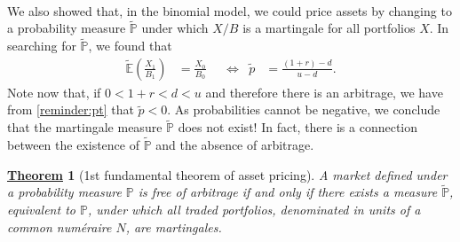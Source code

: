 \documentclass[12pt]{book}
\numberwithin{equation}{chapter}
\theoremstyle{plain}
\newtheorem{theorem}{\underline{Theorem}}
\numberwithin{theorem}{section}
\theoremstyle{definition}
\numberwithin{exercise}{chapter}
\newcommand{\<}{\langle}
\renewcommand{\>}{\rangle}
\renewcommand{\(}{\left(}
\renewcommand{\)}{\right)}
\renewcommand{\[}{\left[}
\renewcommand{\]}{\right]}
\newcommand\Eb{\mathds{E}}
\newcommand\Pb{\mathds{P}}
\newcommand\Ebt{\widetilde{\Eb}}
\newcommand\Pbt{\widetilde{\Pb}}
\theoremstyle{definition}
\numberwithin{question}{section}
\newcommand\pt{\widetilde{p}}
\begin{document}
\\[0.5em]
We also showed that, in the binomial model, we could price assets by changing to a probability measure $\Pbt$ under which $X/B$ is a martingale for all portfolios $X$.  In searching for $\Pbt$, we found that
\begin{align}
\Ebt \( \frac{X_1}{B_1} \) 
	&= \frac{X_0}{B_0} &
	&\Leftrightarrow&
\pt 
	&= \frac{(1+r) - d}{u - d} . \label{reminder:pt}
\end{align}
Note now that, if $0 < 1+r < d < u$ and therefore there is an arbitrage, we have from \eqref{reminder:pt} that $\pt < 0$.
As probabilities cannot be negative, we conclude that the martingale measure $\Pbt$ does not exist!
In fact, there is a connection between the existence of $\Pbt$ and the absence of arbitrage.

\begin{theorem}[1st fundamental theorem of asset pricing]
\label{thm:1st}
A market defined under a probability measure $\Pb$ is free of arbitrage if and only if there exists a measure $\Pbt$, equivalent to $\Pb$, under which all traded portfolios, denominated in units of a common \textit{num\'eraire} $N$, are martingales.
\end{theorem}
\end{document}
